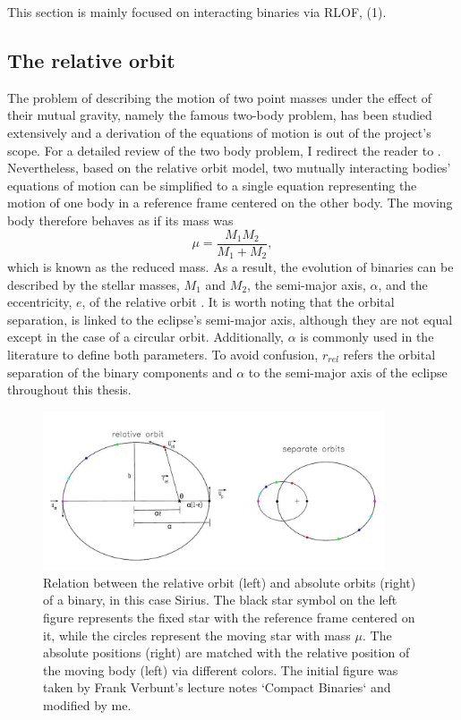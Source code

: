 This section is mainly focused on interacting binaries via RLOF, (1). 

\subsection{The relative orbit}

The problem of describing the motion of two point masses
under the effect of their mutual gravity, namely the famous two-body problem, has been studied extensively and a derivation of the equations of motion is out of the project's scope. For a detailed review of the two body problem, I redirect the reader to  \cite{postnov2014evolution}. Nevertheless, based on the relative orbit model, two mutually interacting bodies' equations of motion can be simplified to a single equation representing the motion of one body in a reference frame centered on the other body. The moving body therefore behaves as if its mass was
\begin{equation}\label{eq:reduced_mass}
    \mu= \frac{M_1 M_2}{M_1 + M_2},
\end{equation}
which is known as the reduced mass. As a result, the evolution of binaries can be described by the stellar masses, $M_1$ and $M_2$, the semi-major axis, $\alpha$, and the eccentricity, $e$, of the relative orbit \citep{sana2012binary,postnov2014evolution,toonen2014popcorn}. It is worth noting that the orbital separation, is linked to the eclipse's semi-major axis, although they are not equal except in the case of a circular orbit. Additionally, $\alpha$ is commonly used in the literature to define both parameters. To avoid confusion, $r_{rel}$ refers the orbital separation of the binary components and $\alpha$ to the semi-major axis of the eclipse throughout this thesis.
\begin{figure}[H]
    \centering
    \includegraphics[width=0.9\textwidth]{Thesis/figures/relative_orbit.pdf}
    \caption{Relation between the relative orbit (left) and absolute orbits (right) of a
    binary, in this case Sirius. The black star symbol on the left figure represents the fixed star with the reference frame centered on it, while the circles represent the moving star with mass $\mu$. The absolute positions (right) are matched with the relative position of the moving body (left) via different colors.   The initial figure was taken by Frank Verbunt's lecture notes `Compact Binaries` and modified by me.}
    \label{fig:relative_orbit}
\end{figure}
